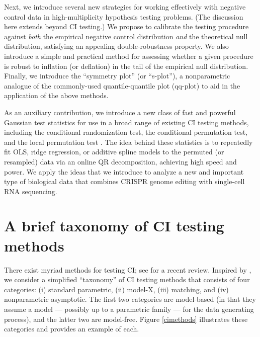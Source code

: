 \documentclass[12pt]{article}
\begin{document}
Next, we introduce several new strategies for working effectively with negative control data in high-multiplicity hypothesis testing problems. (The discussion here extends beyond CI testing.) We propose to calibrate the testing procedure against \textit{both} the empirical negative control distribution \textit{and} the theoretical null distribution, satisfying an appealing double-robustness property. We also introduce a simple and practical method for assessing whether a given procedure is robust to inflation (or deflation) in the tail of the empirical null distribution. Finally, we introduce the ``symmetry plot'' (or ``s-plot''), a nonparametric analogue of the commonly-used quantile-quantile plot (qq-plot) to aid in the application of the above methods. %

As an auxiliary contribution, we introduce a new class of fast and powerful Gaussian test statistics for use in a broad range of existing CI testing methods, including the conditional randomization test, the conditional permutation test, and the local permutation test \parencite{Candes2018a,Berrett2020,Kim2021}. The idea behind these statistics is to repeatedly fit OLS, ridge regression, or additive spline models to the permuted (or resampled) data via an online QR decomposition, achieving high speed and power. %
We apply the ideas that we introduce to analyze a new and important type of biological data that combines CRISPR genome editing with single-cell RNA sequencing.

\section{A brief taxonomy of CI testing methods}

There exist myriad methods for testing CI; see \cite{Kim2021} for a recent review. Inspired by \cite{Kim2021}, we consider a simplified ``taxonomy'' of CI testing methods that consists of four categories: (i) standard parametric, (ii) model-X, (iii) matching, and (iv) nonparametric asymptotic. The first two categories are model-based (in that they assume a model --- possibly up to a parametric family --- for the data generating process), and the latter two are model-free. Figure \ref{cimethods} illustrates these categories and provides an example of each.
\end{document}
